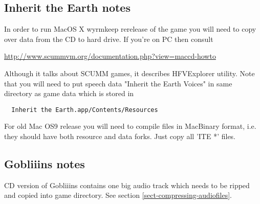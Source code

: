 \subsection{Inherit the Earth notes}
In order to run MacOS X wyrmkeep rerelease of the game you will need to copy
over data from the CD to hard drive. If you're on PC then consult

\url{http://www.scummvm.org/documentation.php?view=maccd-howto}

Although it talks about SCUMM games, it describes HFVExplorer utility. Note
that you will need to put speech data "Inherit the Earth Voices" in same
directory as game data which is stored in

\begin{verbatim}
  Inherit the Earth.app/Contents/Resources
\end{verbatim}

For old Mac OS9 release you will need to compile files in MacBinary format,
i.e. they should have both resource and data forks. Just copy all 'ITE *' files.


\subsection{Gobliiins notes}
CD version of Gobliiins contains one big audio track which needs to be ripped
and copied into game directory. See section \ref{sect-compressing-audiofiles}.

